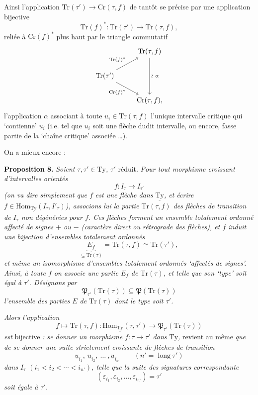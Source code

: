 \documentclass[11pt]{article}
\newcommand{\printedpage}[1]{\if\relax\detokenize{#1}\relax\else\marginpar{\raggedright\footnotesize p.~#1}\fi}
\newcommand{\msp}[1]{\marginpar{\raggedright\footnotesize [#1]}}
\newcommand{\Hom}{\mathrm{Hom}}
\newcommand{\uTy}{\underline{\mathrm{Ty}}}
\newcommand{\Tr}{\mathrm{Tr}}
\newcommand{\Cr}{\mathrm{Cr}}
\newcommand{\lng}{\operatorname{long}}
\begin{document}
Ainsi l'application $\Tr(\tau') \longrightarrow \Cr(\tau, f)$ de tantôt se précise par une application bijective
\[
\Tr(f)^* : \Tr(\tau') \longrightarrow \Tr(\tau, f),
\]
reliée à $\Cr(f)^*$ plus haut par le triangle commutatif
\[
\begin{tikzcd}
 & \Tr(\tau, f) \arrow[dd, "\wr\ \alpha"] \\
\Tr(\tau') \arrow[ur, "\Tr(f)^*"] \arrow[dr, "\Cr(f)^*"'] & \\
 & \Cr(\tau, f),
\end{tikzcd}
\]
\printedpage{25}
\msp{page 39}
l'application $\alpha$ associant à toute $u_i \in \Tr(\tau, f)$ l'unique intervalle critique qui ‘contienne’ $u_i$ (i.e. tel que $u_i$ soit une flèche dudit intervalle, ou encore, fasse partie de la ‘chaîne critique’ associée \dots).

On a mieux encore :

\textbf{Proposition 8.} \textit{Soient $\tau, \tau' \in \mathrm{Ty}$, $\tau'$} réduit. \textit{Pour tout morphisme croissant d'intervalles orientés}
\[
f : I_\tau \longrightarrow I_{\tau'}
\]
\textit{(on va dire simplement que $f$ est une flèche dans $\uTy$, et écrire $f \in \Hom_{\uTy}(I_\tau, I'_\tau)$), associons lui la partie $\Tr(\tau, f)$ des flèches de transition de $I_\tau$ non dégénérées pour $f$. Ces flèches forment un ensemble totalement ordonné affecté de signes $+$ ou $-$ (caractère direct ou rétrograde des flèches), et $f$ induit une bijection d'ensembles totalement ordonnés} %
\[
\underbrace{E_f}_{\subseteq \Tr(\tau)} = \Tr(\tau, f) \simeq \Tr(\tau'),
\]
\textit{et même un isomorphisme d'ensembles totalement ordonnés ‘affectés de signes’. Ainsi, à toute $f$ on associe une partie $E_f$ de $\Tr(\tau)$, et telle que son ‘type’ soit égal à $\tau'$. Désignons par}
\[
\mathfrak{P}_{\tau'}(\Tr(\tau)) \subseteq \mathfrak{P}(\Tr(\tau))
\]
\textit{l'ensemble des parties $E$ de $\Tr(\tau)$ dont le type soit $\tau'$.}

\msp{page 40}
\textit{Alors l'application}
\[
f \longmapsto \Tr(\tau, f) : \Hom_{\uTy}(\tau, \tau') \longrightarrow \mathfrak{P}_{\tau'}(\Tr(\tau))
\]
\textit{est} bijective \textit{: se donner un morphisme $f : \tau \longrightarrow \tau'$ dans $\uTy$,} revient au même \textit{que de se donner une suite strictement croissante de flèches de transition}
\[
\underline{u}_{i_1},\ \underline{u}_{i_2},\ \dots\ ,\underline{u}_{i_{n'}} \qquad (n' = \lng \tau')
\]
\textit{dans $I_\tau$ $(i_1 < i_2 < \cdots < i_{n'})$, telle que la suite des signatures correspondante}
\[
(\varepsilon_{i_1}, \varepsilon_{i_2}, \dots, \varepsilon_{i_{n'}}) = \tau'
\]
\textit{soit égale à $\tau'$.}
\end{document}
